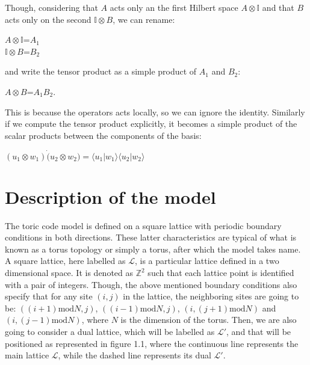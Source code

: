 \documentclass{Configuration_Files/PoliMi3i_thesis}
\begin{document}
Though, considering that $A$ acts only an the first Hilbert space $A \otimes \mathbb{I}$ and that $B$ acts only on the second $\mathbb{I} \otimes B$, we can rename:

\begin{center}
	$A \otimes \mathbb{I}$=$A_1$ \\
	$\mathbb{I} \otimes B$=$B_2$
\end{center}

and write the tensor product as a simple product of $A_1$ and $B_2$:

\begin{center}
	$A \otimes B$=$A_1$$B_2$.
\end{center}

This is because the operators acts locally, so we can ignore the identity. \newline
Similarly if we compute the tensor product explicitly, it becomes a simple product of the scalar products between the components of the basis:

\begin{center}
	$(u_1 \otimes w_1) \dot (u_2 \otimes w_2) = \langle u_1 | w_1 \rangle \langle u_2 | w_2 \rangle$
\end{center}








\newpage
\section{Description of the model}
\label{sec:Model}

The toric code model is defined on a square lattice with periodic boundary conditions in both directions. These latter characteristics are typical of what is known as a torus topology or simply a torus, after which the model takes name.\newline
A square lattice, here labelled as $\mathcal{L}$, is a particular lattice defined in a two dimensional space. It is denoted as $\mathbb{Z}^{2}$ such that each lattice point is identified with a pair of integers. Though, the above mentioned boundary conditions also specify that for any site $(i, j)$ in the lattice, the neighboring sites are going to be: $((i+1)\mathrm{mod}N, j)$, $((i-1)\mathrm{mod} N, j)$, $(i, (j+1)\mathrm{mod}N)$ and $(i, (j-1)\mathrm{mod}N)$, where $N$ is the dimension of the torus.  \newline
Then, we are also going to consider a dual lattice, which will be labelled as $\mathcal{L}'$, and that will be positioned as represented in figure 1.1, where the continuous line represents the main lattice $\mathcal{L}$, while the dashed line represents its dual $\mathcal{L'}$.  	\newline
\end{document}
